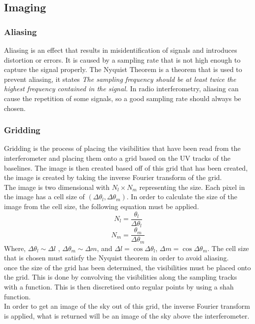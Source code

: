 \subsection{Imaging}
\subsubsection{Aliasing}\label{sec:Aliasing}
Aliasing is an effect that results in misidentification of signals and introduces distortion or errors. It is caused by a sampling rate that is not high enough to capture the signal properly\cite{aliasing}. The Nyquist Theorem is a theorem that is used to prevent aliasing, it states \textit{The sampling frequency should be at least twice the highest frequency contained in the signal.}\cite{aliasing} In radio interferometry, aliasing can cause the repetition of some signals, so a good sampling rate should always be chosen.

\subsubsection{Gridding}
Gridding is the process of placing the visibilities that have been read from the interferometer and placing them onto a grid based on the UV tracks of the baselines. The image is then created based off of this grid that has been created, the image is created by taking the inverse Fourier transform of the grid.\\
The image is two dimensional with $N_l \times N_m$ representing the size. Each pixel in the image has a cell size of $(\Delta \theta_l, \Delta \theta_m)$. In order to calculate the size of the image from the cell size, the following equation must be applied. $$N_l = \frac{\theta_l}{\Delta \theta_l}$$
$$N_m = \frac{\theta_m}{\Delta \theta_m}$$
Where,  $\Delta \theta_l\sim \Delta l$ , $\Delta \theta_m \sim \Delta m$, and $\Delta l = \cos{\Delta \theta_l}$, $\Delta m = \cos{\Delta \theta_m}$. The cell size that is chosen must satisfy the Nyquist theorem in order to avoid aliasing.\\
once the size of the grid has been determined, the visibilities must be placed onto the grid. This is done by convolving the visibilities along the sampling tracks with a function. This is then discretised onto regular points by using a shah function.\\
In order to get an image of the sky out of this grid, the inverse Fourier transform is applied, what is returned will be an image of the sky above the interferometer.

